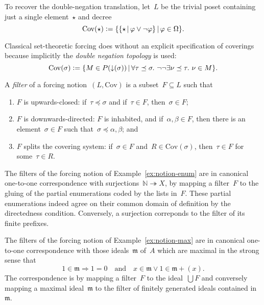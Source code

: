 \documentclass[envcountsect,envcountsame,runningheads]{llncs}
\newcommand{\mmm}{\mathfrak{m}}
\newcommand{\NN}{\mathbb{N}}
\newcommand{\defeq}{\vcentcolon=}
\newcommand{\Cov}{\mathrm{Cov}}
\renewcommand{\_}{\mathpunct{.}\,}
\begin{document}
\begin{example}\label{ex:notion-negneg}To recover the double-negation translation, let~$L$ be the
trivial poset containing just a single element~$\star$ and decree
\[ \Cov(\star) \defeq \{ \{ \star \,|\, \varphi \vee \neg\varphi \} \,|\, \varphi \in \Omega \}. \]
\end{example}

\begin{remark}Classical set-theoretic forcing
does without an explicit specification of coverings because implicitly the
\emph{double negation topology} is used:
\[ \Cov(\sigma) \defeq \{ M \in P({\downarrow}(\sigma)) \,|\,
  \forall \tau \preceq \sigma\_ \neg\neg \exists \nu \preceq \tau\_ \nu \in M
  \}. \]
\end{remark}

\begin{definition}A \emph{filter} of a forcing notion~$(L,\mathrm{Cov})$
is a subset~$F \subseteq L$ such that
\begin{enumerate}
\item $F$ is upwards-closed: if~$\tau \preceq \sigma$ and if~$\tau \in F$,
then~$\sigma \in F$;
\item $F$ is downwards-directed: $F$ is inhabited, and if~$\alpha,\beta \in F$,
then there is an element~$\sigma \in F$ such that~$\sigma \preceq
\alpha,\beta$; and
\item $F$ splits the covering system: if~$\sigma \in F$ and~$R \in
\Cov(\sigma)$, then~$\tau \in F$ for some~$\tau \in R$.
\end{enumerate}
\end{definition}

\begin{example}The filters of the forcing notion of
Example~\ref{ex:notion-enum} are in canonical one-to-one correspondence with
surjections~$\NN \twoheadrightarrow X$, by mapping a filter~$F$ to the gluing
of the partial enumerations coded by the lists in~$F$. These partial
enumerations indeed agree on their common domain of definition by the
directedness condition. Conversely, a surjection correponds to the filter of
its finite prefixes.
\end{example}

\begin{example}The filters of the forcing notion of
Example~\ref{ex:notion-max} are in canonical one-to-one correspondence with
those ideals~$\mmm$ of~$A$ which are maximal in the strong sense that
\[
  1 \in \mmm \Longrightarrow 1 = 0
    \quad\text{and}\quad
  x \in \mmm \vee 1 \in \mmm + (x).
\]
The correspondence is by mapping a filter~$F$ to the ideal~$\bigcup F$
and conversely mapping a maximal ideal~$\mmm$ to the filter of finitely
generated ideals contained in~$\mmm$.
\end{example}
\end{document}
